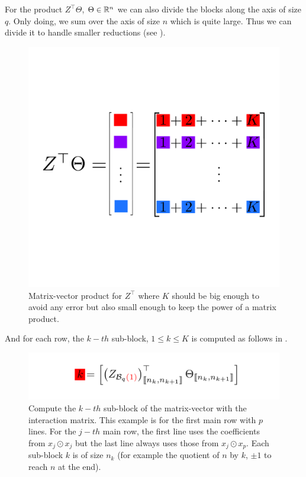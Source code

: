 \documentclass[a4]{article}
\begin{document}
\medskip

For the product $Z^\top \Theta$, $\Theta\in\mathbb{R}^n$ we can also divide the blocks along the axis of size $q$.
Only doing, we sum over the axis of size $n$ which is quite large. Thus we can divide it to handle smaller reductions (see ).

\begin{figure}[htbp]
	\centering
	\includegraphics[scale=.3, clip, trim={1cm 8cm 1cm 8cm}]{./prebuilt_images/Ztranspose_matvec.pdf}
	\caption{Matrix-vector product for $Z^\top$ where $K$ should be big enough to avoid any error but
	also small enough to keep the power of a matrix product.}
	\label{fig:mat_trans}
\end{figure}

And for each row, the $k-th$ sub-block, $1\leq k\leq K$ is computed as follows in .
\begin{figure}[htbp]
	\centering
	\includegraphics[scale=.2]{./prebuilt_images/prod_matvectrans_block.pdf}
	\caption{Compute the $k-th$ sub-block of the matrix-vector with the interaction matrix. This example
	is for the first main row with $p$ lines. For the $j-th$ main row, the first line uses the coefficients from $x_j\odot x_j$
	but the last line always uses those from $x_j\odot x_p$. Each sub-block $k$ is of size $n_k$ (for example the quotient of $n$ by $k$,
	$\pm 1$ to reach $n$ at the end).}
	\label{fig:compute_sub_block}
\end{figure}
\end{document}

